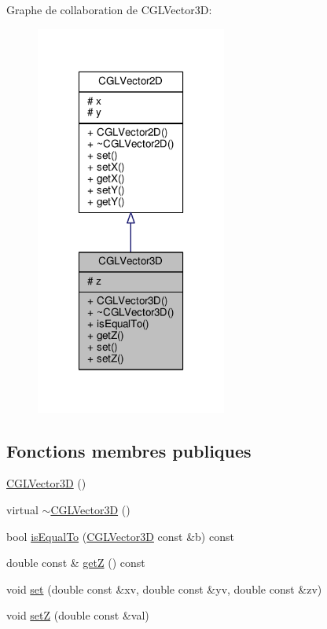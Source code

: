 Graphe de collaboration de C\-G\-L\-Vector3\-D\-:\nopagebreak
\begin{figure}[H]
\begin{center}
\leavevmode
\includegraphics[width=178pt]{d6/d30/class_c_g_l_vector3_d__coll__graph}
\end{center}
\end{figure}
\subsection*{Fonctions membres publiques}
\begin{DoxyCompactItemize}
\item 
\hyperlink{class_c_g_l_vector3_d_a23c221e455e1b5e4733c0e9baf68c1f3}{C\-G\-L\-Vector3\-D} ()
\item 
virtual \hyperlink{class_c_g_l_vector3_d_ae7a23a5f882bbdd9489f51ddc86b0f02}{$\sim$\-C\-G\-L\-Vector3\-D} ()
\item 
bool \hyperlink{class_c_g_l_vector3_d_a339da32afa5a535aec027aba6b92e9b5}{is\-Equal\-To} (\hyperlink{class_c_g_l_vector3_d}{C\-G\-L\-Vector3\-D} const \&b) const 
\item 
double const \& \hyperlink{class_c_g_l_vector3_d_a374bca193aae71220f1349a6ab0778ee}{get\-Z} () const 
\item 
void \hyperlink{class_c_g_l_vector3_d_a15014f4427c214f64699590591cacc8f}{set} (double const \&xv, double const \&yv, double const \&zv)
\item 
void \hyperlink{class_c_g_l_vector3_d_afef476ba51f4f45cb9d64e5d6c1592a4}{set\-Z} (double const \&val)
\end{DoxyCompactItemize}
